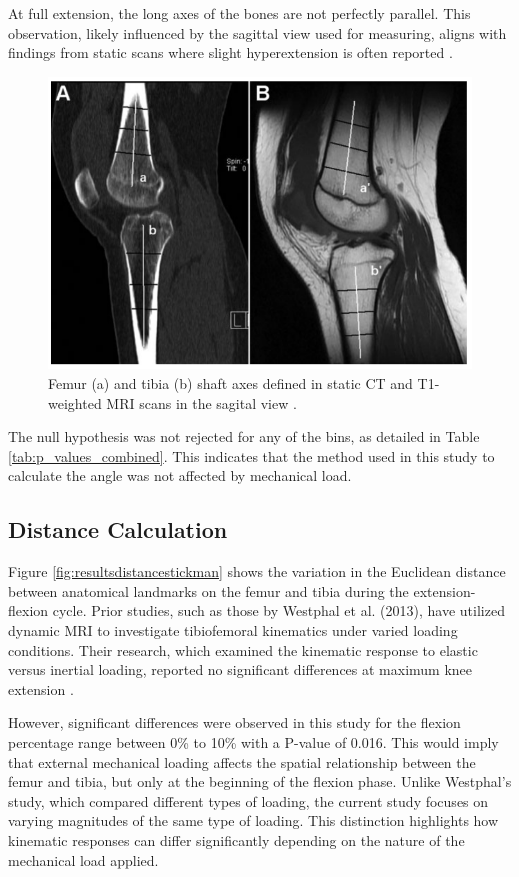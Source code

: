 \documentclass{micro-econ-thesis}
\begin{document}
At full extension, the long axes of the bones are not perfectly parallel. This observation, likely influenced by the sagittal view used for measuring, aligns with findings from static scans where slight hyperextension is often reported \parencite{dai_comparing_2021}. 

\begin{figure}[H]
	\centering
	\includegraphics[width=0.7\linewidth]{dai_image}
	\caption{Femur (a) and tibia (b) shaft axes defined in static CT and T1-weighted MRI scans in the sagital view \parencite{dai_comparing_2021}. }
	\label{fig:daiimage}
\end{figure}

The null hypothesis was not rejected for any of the bins, as detailed in Table \ref{tab:p_values_combined}. This indicates that the method used in this study to calculate the angle was not affected by mechanical load.



\subsection{Distance Calculation}

Figure \ref{fig:resultsdistancestickman} shows the variation in the Euclidean distance between anatomical landmarks on the femur and tibia during the extension-flexion cycle. Prior studies, such as those by Westphal et al. (2013), have utilized dynamic MRI to investigate tibiofemoral kinematics under varied loading conditions. Their research, which examined the kinematic response to elastic versus inertial loading, reported no significant differences at maximum knee extension \parencite{westphal_load-dependent_2013}.

However, significant differences were observed in this study for the flexion percentage range between 0\% to 10\% with a P-value of 0.016. This would imply that external mechanical loading affects the spatial relationship between the femur and tibia, but only at the beginning of the flexion phase.  Unlike Westphal's study, which compared different types of loading, the current study focuses on varying magnitudes of the same type of loading. This distinction highlights how kinematic responses can differ significantly depending on the nature of the mechanical load applied.
\end{document}
